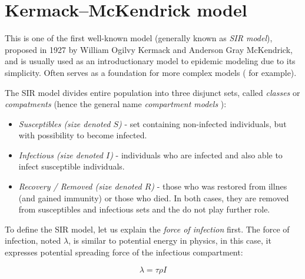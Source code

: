 \documentclass[
  digital, %
  oneside, %
  lof,     %
  lot,     %
]{fithesis4}
\begin{document}




\section{Kermack–McKendrick model}

This is one of the first well-known model (generally 
known as \textit{SIR model}), proposed in 1927 by 
William Ogilvy Kermack and Anderson Gray McKendrick, and is 
usually used as an introductionary model to epidemic 
modeling \cite{martcheva2015} due to its simplicity. 
Often serves as a foundation for more complex 
models (\cite{clancy2008} for example).

The SIR model divides entire population into three disjunct 
sets, called \textit{classes} or \textit{compatments} (hence the general 
name \textit{compartment models} \cite{bacaer2011}):

\begin{itemize}
  \item \textit{Susceptibles (size denoted $S$)} - set containing non-infected individuals, but with possibility to become infected.
  \item \textit{Infectious (size denoted $I$)} - individuals who are infected and also able to infect susceptible individuals.
  \item \textit{Recovery / Removed (size denoted $R$)} - those who was restored from illnes (and gained immunity) or those who died. In both cases, they are removed from susceptibles and infectious sets and the do not play further role.
\end{itemize}

To define the SIR model, let us explain the \textit{force of infection} first.
The force of infection, noted $\lambda$, is similar to 
potential energy in physics, in this case, it expresses 
potential spreading force of the infectious compartment:

\begin{equation}
	\lambda = \tau \rho I
\end{equation}
\end{document}
